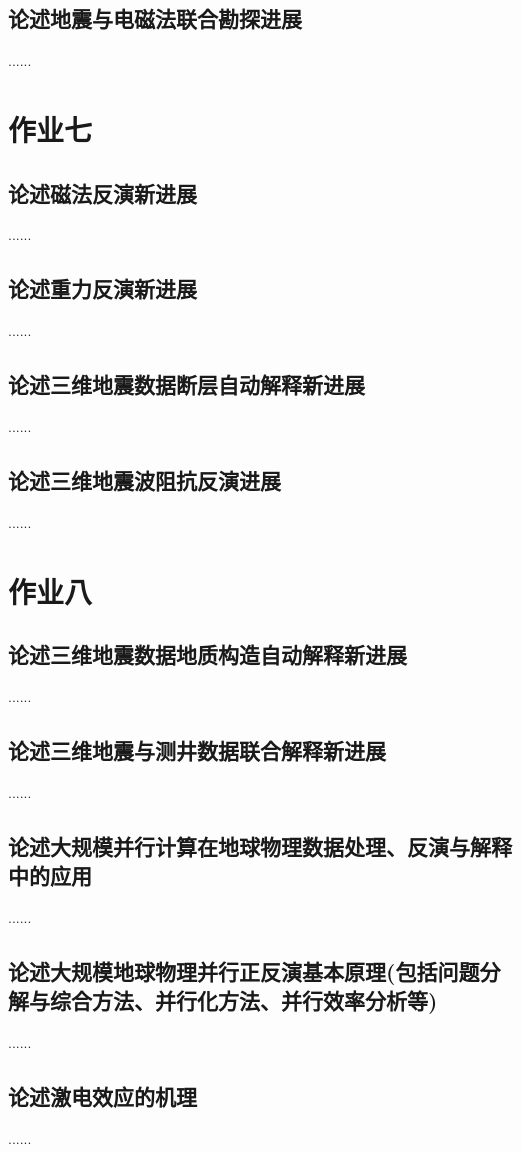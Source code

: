 \documentclass{coursework}
\begin{document}
	\subsection{论述地震与电磁法联合勘探进展}
	......
	\section{作业七}
	\subsection{论述磁法反演新进展}
	......
	\subsection{论述重力反演新进展}
	......
	\subsection{论述三维地震数据断层自动解释新进展}
	......
	\subsection{论述三维地震波阻抗反演进展}
	......
	\section{作业八}
	\subsection{论述三维地震数据地质构造自动解释新进展}
	......
	\subsection{论述三维地震与测井数据联合解释新进展}
	......
	\subsection{论述大规模并行计算在地球物理数据处理、反演与解释中的应用}
	......
	\subsection{论述大规模地球物理并行正反演基本原理(包括问题分解与综合方法、并行化方法、并行效率分析等)}
	......
	\subsection{论述激电效应的机理}
	......
	
	
\end{document}
